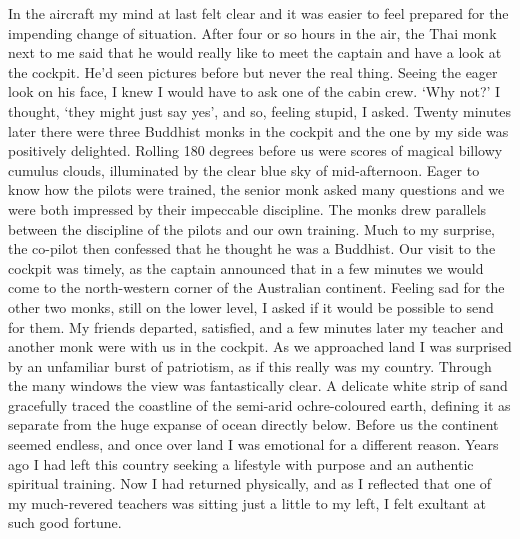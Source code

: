 In the aircraft my mind at last felt clear and it was easier to feel
prepared for the impending change of situation. After four or so hours
in the air, the Thai monk next to me said that he would really like to
meet the captain and have a look at the cockpit. He'd seen pictures
before but never the real thing. Seeing the eager look on his face, I
knew I would have to ask one of the cabin crew. `Why not?' I thought, 
`they might just say yes', and so, feeling stupid, I asked. Twenty
minutes later there were three Buddhist monks in the cockpit and the one
by my side was positively delighted. Rolling 180 degrees before us were
scores of magical billowy cumulus clouds, illuminated by the clear blue
sky of mid-afternoon. Eager to know how the pilots were trained, the
senior monk asked many questions and we were both impressed by their
impeccable discipline. The monks drew parallels between the discipline
of the pilots and our own training. Much to my surprise, the co-pilot
then confessed that he thought he was a Buddhist. Our visit to the
cockpit was timely, as the captain announced that in a few minutes we
would come to the north-western corner of the Australian continent. 
Feeling sad for the other two monks, still on the lower level, I asked
if it would be possible to send for them. My friends departed, 
satisfied, and a few minutes later my teacher and another monk were with
us in the cockpit. As we approached land I was surprised by an
unfamiliar burst of patriotism, as if this really was my country. 
Through the many windows the view was fantastically clear. A delicate
white strip of sand gracefully traced the coastline of the semi-arid
ochre-coloured earth, defining it as separate from the huge expanse of
ocean directly below. Before us the continent seemed endless, and once
over land I was emotional for a different reason. Years ago I had left
this country seeking a lifestyle with purpose and an authentic spiritual
training. Now I had returned physically, and as I reflected that one of
my much-revered teachers was sitting just a little to my left, I felt
exultant at such good fortune. 


